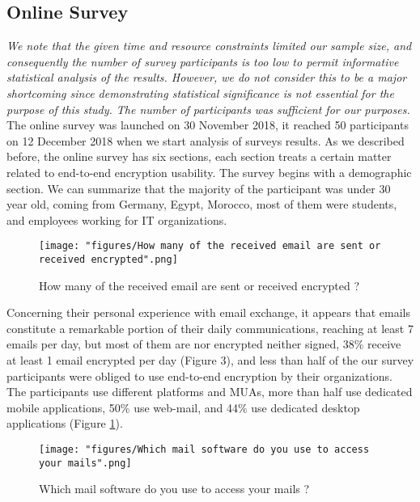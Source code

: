 \subsection{Online Survey}
\textit{We note that the given time and resource constraints limited our sample size, and consequently the number of survey participants is too low to permit informative statistical analysis of the results. However, we do not consider this to be a major shortcoming since demonstrating statistical significance is not essential for the purpose of this study. The number of participants was sufficient for our purposes.}
\newline
The online survey was launched on 30 November 2018, it reached 50 participants on 12 December 2018 when we start analysis of surveys results.
\newline
As we described before, the online survey has six sections, each section treats a certain matter related to end-to-end encryption usability. The survey begins with a demographic section. We can summarize that the majority of the participant was under 30 year old, coming from Germany, Egypt, Morocco, most of them were students, and employees working for IT organizations.
\newline
\newline
\begin{figure}
	\texttt{[image: "figures/How many of the received email are sent or received encrypted".png]}
	\centering
	\caption{How many of the received email are sent or received encrypted ?}
\end{figure}
Concerning their personal experience with email exchange, it appears that emails constitute a remarkable portion of their daily communications, reaching at least 7 emails per day, but most of them are nor encrypted neither signed, 38\% receive at least 1 email encrypted per day (Figure 3), and less than half of the our survey participants were obliged to use end-to-end encryption by their organizations.
\newline
\newline
The participants use different platforms and MUAs, more than half use dedicated mobile applications, 50\% use web-mail, and 44\% use dedicated desktop applications (Figure \ref{fig:encryptedemail}).
\newline
\newline
\begin{figure}
	\texttt{[image: "figures/Which mail software do you use to access your mails".png]}
	\centering
	\caption{Which mail software do you use to access your mails ?}
	\label{fig:encryptedemail}
\end{figure}
